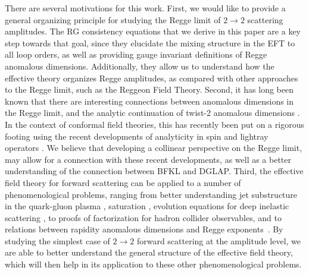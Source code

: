 \documentclass[letterpaper,11pt]{article}
\begin{document}
There are several motivations for this work. First, we would like to provide a general organizing principle for studying the Regge limit of $2\to 2$ scattering amplitudes. The RG consistency equations that we derive in this paper are a key step towards that goal, since they elucidate the mixing structure in the EFT to all loop orders, as well as providing gauge invariant definitions of Regge anomalous dimensions. Additionally, they allow us to understand how the effective theory organizes Regge amplitudes, as compared with other approaches to the Regge limit, such as the Reggeon Field Theory.
% 
Second, it has long been known that there are interesting connections between anomalous dimensions in the Regge limit, and the analytic continuation of twist-2 anomalous dimensions \cite{Jaroszewicz:1980mq,Jaroszewicz:1982gr,Kotikov:2007cy,Kotikov:2004er,Kotikov:2002ab,Kotikov:2000pm,Brower:2006ea}. In the context of conformal field theories, this has recently been put on a rigorous footing using the recent developments of analyticity in spin \cite{Caron-Huot:2017vep} and lightray operators \cite{Kravchuk:2018htv,Kologlu:2019mfz,Caron-Huot:2022eqs}. We believe that developing a collinear perspective on the Regge limit, may allow for a connection with these recent developments, as well as a better understanding of the connection between BFKL and DGLAP.
%
Third, the effective field theory for forward scattering can be applied to a number of phenomenological problems, ranging from better understanding jet substructure in the quark-gluon plasma \cite{Vaidya:2021mjl,Vaidya:2020lih,Vaidya:2021vxu,Vaidya:2021mly}, saturation \cite{Stewart:2023lwz}, evolution equations for deep inelastic scattering \cite{Neill:2023jcd}, to proofs of factorization for hadron collider observables, and to relations between rapidity anomalous dimensions and Regge exponents~\cite{DelDuca:2017pmn,Moult:2022lfy,Rothstein:2023dgb}. By studying the simplest case of $2\to 2$ forward scattering at the amplitude level, we are able to better understand the general structure of the effective field theory, which will then help in its application to these other phenomenological problems.
\end{document}
